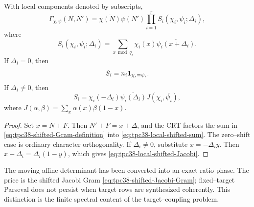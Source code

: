 \begin{theorem}
\label{thm:tpc38-shifted-Jacobi-Gram}
With local components denoted by subscripts,
\begin{equation}
 \boxed{
 \Gamma_{\chi,\psi}(N,N')
 =\overline{\chi(N)}\psi(N')
 \prod_{i=1}^r
 S_i(\chi_i,\psi_i;\Delta_i),}
 \label{eq:tpc38-shifted-Jacobi-Gram}
\end{equation}
where
\begin{equation}
 S_i(\chi_i,\psi_i;\Delta_i)
 =\sum_{x\bmod q_i}\chi_i(x)
 \overline{\psi_i(x+\Delta_i)}.
 \label{eq:tpc38-local-shifted-sum}
\end{equation}
If \(\Delta_i=0\), then
\begin{equation}
 S_i=n_i\mathbf 1_{\chi_i=\psi_i}.
 \label{eq:tpc38-local-shifted-zero}
\end{equation}
If \(\Delta_i\ne0\), then
\begin{equation}
 \boxed{
 S_i
 =\chi_i(-\Delta_i)\overline{\psi_i(\Delta_i)}
 J(\chi_i,\overline{\psi_i}),}
 \label{eq:tpc38-local-shifted-Jacobi}
\end{equation}
where \(J(\alpha,\beta)=\sum_x\alpha(x)\beta(1-x)\).
\end{theorem}

\begin{proof}
Set \(x=N+F\).  Then \(N'+F=x+\Delta\), and the CRT factors the sum in
\eqref{eq:tpc38-shifted-Gram-definition} into
\eqref{eq:tpc38-local-shifted-sum}.  The zero--shift case is ordinary
character orthogonality.  If \(\Delta_i\ne0\), substitute
\(x=-\Delta_i y\).  Then \(x+\Delta_i=\Delta_i(1-y)\), which gives
\eqref{eq:tpc38-local-shifted-Jacobi}.
\end{proof}

\begin{remark}
\label{rem:tpc38-fixed-versus-moving-target}
The moving affine determinant has been converted into an exact ratio
phase.  The price is the shifted Jacobi Gram
\eqref{eq:tpc38-shifted-Jacobi-Gram}; fixed--target Parseval does not
persist when target rows are synthesized coherently.  This distinction is
the finite spectral content of the target--coupling problem.
\end{remark}
